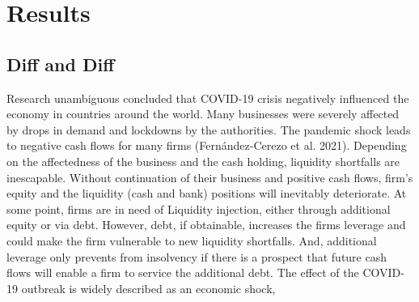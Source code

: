
\chapter{Results} %

\label{Chapter5} %


\section{Diff and Diff}

Research unambiguous concluded that COVID-19 crisis negatively influenced the economy in countries around the world. Many businesses were severely affected by drops in demand and lockdowns by the authorities. The pandemic shock leads to negative cash flows for many firms (Fernández-Cerezo et al. 2021). Depending on the affectedness of the business and the cash holding, liquidity shortfalls are inescapable. 
Without continuation of their business and positive cash flows, firm’s equity and the liquidity (cash and bank) positions will inevitably deteriorate. At some point, firms are in need of Liquidity injection, either through additional equity or via debt. However, debt, if obtainable, increases the firms leverage and could make the firm vulnerable to new liquidity shortfalls. And, additional leverage only prevents from insolvency if there is a prospect that future cash flows will enable a firm to service the additional debt.
The effect of the COVID-19 outbreak is widely described as an economic shock,

